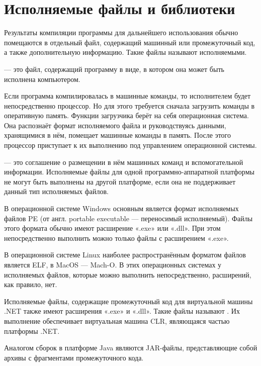 \section{Исполняемые файлы и библиотеки}

Результаты компиляции программы для дальнейшего использования обычно
помещаются в отдельный файл, содержащий машинный или промежуточный
код, а также дополнительную информацию. Такие файлы называют
исполняемыми.

\begin{defn}
   — это файл, содержащий
  программу в виде, в котором она может быть исполнена компьютером.
\end{defn}

Если программа компилировалась в машинные команды, то исполнителем
будет непосредственно процессор. Но для этого требуется сначала
загрузить команды в оперативную память. Функции загрузчика берёт на
себя операционная система. Она распознаёт формат исполняемого файла и
руководствуясь данными, хранящимися в нём, помещает машинные команды в
память. После этого процессор приступает к их выполнению под
управлением операционной системы.

 — это
соглашение о размещении в нём машинных команд и вспомогательной
информации. Исполняемые файлы для одной программно-аппаратной
платформы не могут быть выполнены на другой платформе, если она не
поддерживает данный тип исполняемых файлов.

В операционной системе Windows основным является формат исполняемых
файлов PE (от англ. portable executable — переносимый
исполняемый). Файлы этого формата обычно имеют расширение «.exe» или
«.dll». При этом непосредственно выполнить можно только файлы с
расширением «.exe».

В операционной системе Linux наиболее распространённым форматом файлов
является ELF, в MacOS — Mach-O. В этих операционных системах у
исполняемых файлов, которые можно выполнить непосредственно,
расширений, как правило, нет.

Исполняемые файлы, содержащие промежуточный код для виртуальной машины
.NET также имеют расширения «.exe» и «.dll». Такие файлы называют
. Их выполнение обеспечивает виртуальная
машина CLR, являющаяся частью платформы .NET.

Аналогом сборок в платформе Java являются JAR-файлы, представляющие
собой архивы с фрагментами промежуточного кода.

